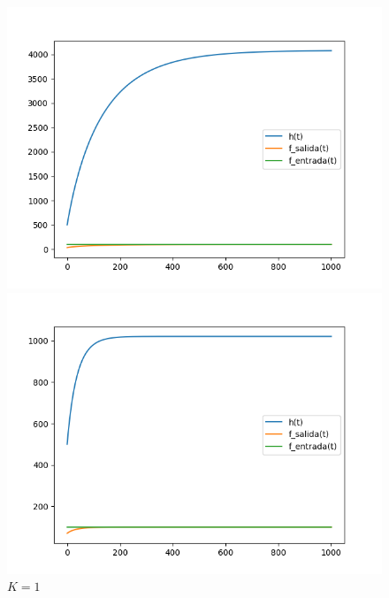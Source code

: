 \documentclass[12pt]{article}
\begin{document}
\begin{figure}[h]
	\begin{minipage}{0.32\textwidth}
		\centering
		\includegraphics[width=\linewidth]{c100k05}
		\caption{$K = 0.5$}
		\label{gr:c100k0.5}
	\end{minipage}
	\begin{minipage}{0.32\textwidth}
		\centering
		\includegraphics[width=\linewidth]{c100k1}
		\caption{$K = 1$}
		\label{gr:c100k1}
	\end{minipage}
	\begin{minipage}{0.32\textwidth}
		\centering

\end{minipage}
\end{figure}
\end{document}
